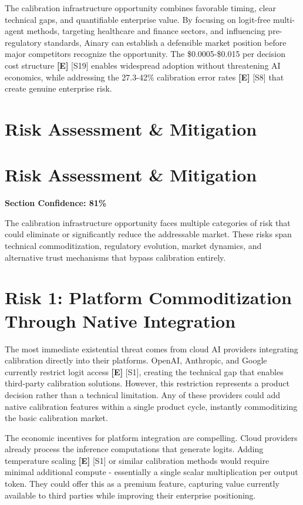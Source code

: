 \documentclass[a4paper,11pt]{article}
\newcommand{\elabel}{\textbf{\textcolor{ecolor}{[E]}}}
\begin{document}
The calibration infrastructure opportunity combines favorable timing, clear technical gaps, and quantifiable enterprise value. By focusing on logit-free multi-agent methods, targeting healthcare and finance sectors, and influencing pre-regulatory standards, Ainary can establish a defensible market position before major competitors recognize the opportunity. The \$0.0005-\$0.015 per decision cost structure \elabel{} \textcolor{primary}{[S19]} enables widespread adoption without threatening AI economics, while addressing the 27.3-42\% calibration error rates \elabel{} \textcolor{primary}{[S8]} that create genuine enterprise risk.

\clearpage
\section{Risk Assessment \& Mitigation}

\section{Risk Assessment \& Mitigation}

\textbf{Section Confidence: 81\%}\par

The calibration infrastructure opportunity faces multiple categories of risk that could eliminate or significantly reduce the addressable market. These risks span technical commoditization, regulatory evolution, market dynamics, and alternative trust mechanisms that bypass calibration entirely.


\section{Risk 1: Platform Commoditization Through Native Integration}

The most immediate existential threat comes from cloud AI providers integrating calibration directly into their platforms. OpenAI, Anthropic, and Google currently restrict logit access \elabel{} \textcolor{primary}{[S1]}, creating the technical gap that enables third-party calibration solutions. However, this restriction represents a product decision rather than a technical limitation. Any of these providers could add native calibration features within a single product cycle, instantly commoditizing the basic calibration market.


The economic incentives for platform integration are compelling. Cloud providers already process the inference computations that generate logits. Adding temperature scaling \elabel{} \textcolor{primary}{[S1]} or similar calibration methods would require minimal additional compute - essentially a single scalar multiplication per output token. They could offer this as a premium feature, capturing value currently available to third parties while improving their enterprise positioning.
\end{document}
